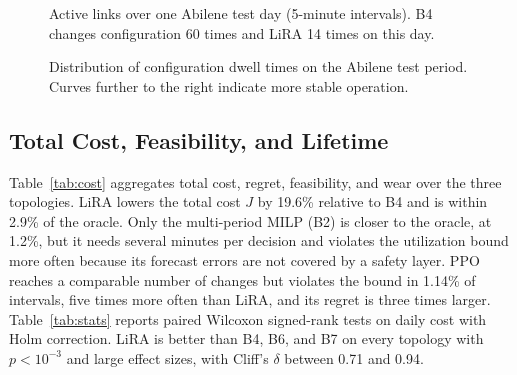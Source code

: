 \documentclass[journal]{IEEEtran}
\begin{document}
\begin{figure}[t]
\centering
{}
\caption{Active links over one Abilene test day (5-minute intervals). B4 changes configuration 60 times and LiRA 14 times on this day.}
\label{fig:timeseries}
\end{figure}

\begin{figure}[t]
\centering
{}
\caption{Distribution of configuration dwell times on the Abilene test period. Curves further to the right indicate more stable operation.}
\label{fig:dwell}
\end{figure}

\subsection{Total Cost, Feasibility, and Lifetime}

Table~\ref{tab:cost} aggregates total cost, regret, feasibility, and wear over the three topologies. LiRA lowers the total cost $J$ by 19.6\% relative to B4 and is within 2.9\% of the oracle. Only the multi-period MILP (B2) is closer to the oracle, at 1.2\%, but it needs several minutes per decision and violates the utilization bound more often because its forecast errors are not covered by a safety layer. PPO reaches a comparable number of changes but violates the bound in 1.14\% of intervals, five times more often than LiRA, and its regret is three times larger. Table~\ref{tab:stats} reports paired Wilcoxon signed-rank tests on daily cost with Holm correction. LiRA is better than B4, B6, and B7 on every topology with $p<10^{-3}$ and large effect sizes, with Cliff's $\delta$ between 0.71 and 0.94.
\end{document}
